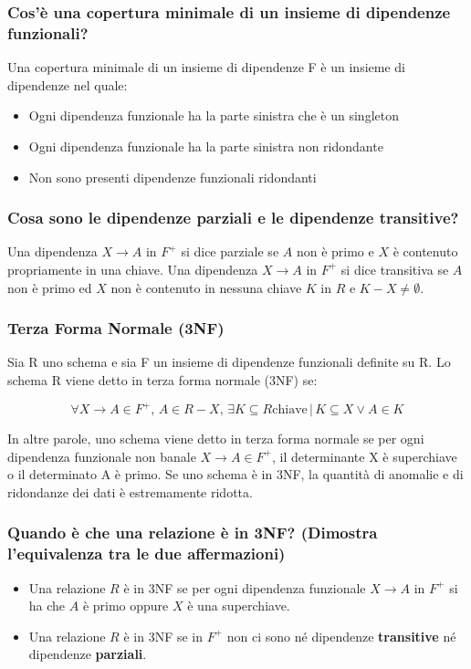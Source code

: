 \documentclass{article}
\begin{document}
\subsubsection{Cos'è una copertura minimale di un insieme di dipendenze funzionali?}
Una copertura minimale di un insieme di dipendenze F è un insieme di dipendenze nel quale:
\begin{itemize}
  \item Ogni dipendenza funzionale ha la parte sinistra che è un singleton
  \item Ogni dipendenza funzionale ha la parte sinistra non ridondante
  \item Non sono presenti dipendenze funzionali ridondanti
\end{itemize}



\subsubsection{Cosa sono le dipendenze parziali e le dipendenze transitive?}
Una dipendenza $X \rightarrow A$ in $F^+$ si dice parziale se $A$ non è primo e $X$ è contenuto propriamente in una chiave. Una dipendenza $X \rightarrow A$ in $F^+$ si dice transitiva se $A$ non è primo ed $X$ non è contenuto in nessuna chiave $K$ in $R$ e $K - X \neq \emptyset$.\\

\subsubsection{Terza Forma Normale (3NF)}
Sia R uno schema e sia F un insieme di dipendenze funzionali definite su R. Lo schema R viene detto in terza forma normale (3NF) se:

\[\forall X \rightarrow A \in F^+, \, A \in R - X, \, \exists K \subseteq R \text{chiave} \,|\, K \subseteq X \vee A \in K\]

In altre parole, uno schema viene detto in terza forma normale se per ogni dipendenza funzionale non banale $X \rightarrow A \in F^+$, il determinante X è superchiave o il determinato A è primo.
Se uno schema è in 3NF, la quantità di anomalie e di ridondanze dei dati è estremamente ridotta.

\subsubsection{Quando è che una relazione è in 3NF? (Dimostra l'equivalenza tra le due affermazioni)}
\begin{itemize}
  \item Una relazione $R$ è in 3NF se per ogni dipendenza funzionale $X \rightarrow A$ in $F^+$ si ha che $A$ è primo oppure $X$ è una superchiave. \item Una relazione $R$ è in 3NF se in $F^+$ non ci sono né dipendenze \textbf{transitive} né dipendenze \textbf{parziali}.\\
\end{itemize}
\end{document}
